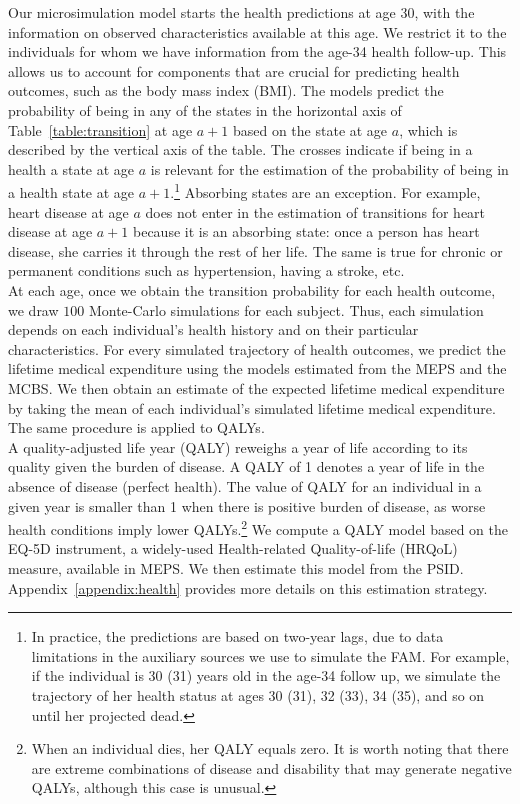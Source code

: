 \noindent Our microsimulation model starts the health predictions at age 30, with the information on observed characteristics available at this age. We restrict it to the individuals for whom we have information from the age-34 health follow-up. This allows us to account for components that are crucial for predicting health outcomes, such as the body mass index (BMI). The models predict the probability of being in any of the states in the horizontal axis of Table~\ref{table:transition} at age $a+1$ based on the state at age $a$, which is described by the vertical axis of the table. The crosses indicate if being in a health a state at age $a$ is relevant for the estimation of the probability of being in a health state at age $a + 1$.\footnote{In practice, the predictions are based on two-year lags, due to data limitations in the auxiliary sources we use to simulate the FAM. For example, if the individual is 30 (31) years old in the age-34 follow up, we simulate the trajectory of her health status at ages 30 (31), 32 (33), 34 (35), and so on until her projected dead.} Absorbing states are an exception. For example, heart disease at age $a$ does not enter in the estimation of transitions for heart disease at age $a+1$ because it is an absorbing state: once a person has heart disease, she carries it through the rest of her life. The same is true for chronic or permanent conditions such as hypertension, having a stroke, etc.\\

\noindent At each age, once we obtain the transition probability for each health outcome, we draw $100$ Monte-Carlo simulations for each subject. Thus, each simulation depends on each individual's health history and on their particular characteristics. For every simulated trajectory of health outcomes, we predict the lifetime medical expenditure using the models estimated from the MEPS and the MCBS. We then obtain an estimate of the expected lifetime medical expenditure by taking the mean of each individual's simulated lifetime medical expenditure. The same procedure is applied to QALYs.\\

\noindent A quality-adjusted life year (QALY) reweighs a year of life according to its quality given the burden of disease. A QALY of 1 denotes a year of life in the absence of disease (perfect health). The value of QALY for an individual in a given year is smaller than 1 when there is positive burden of disease, as worse health conditions imply lower QALYs.\footnote{When an individual dies, her QALY equals zero. It is worth noting that there are extreme combinations of disease and disability that may generate negative QALYs, although this case is unusual.} We compute a QALY model based on the EQ-5D instrument, a widely-used Health-related Quality-of-life (HRQoL) measure, available in MEPS. We then estimate this model from the PSID. Appendix~\ref{appendix:health} provides more details on this estimation strategy. \\

